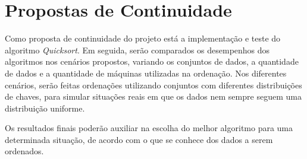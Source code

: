  
\section{Propostas de Continuidade}



Como proposta de continuidade do projeto está a implementação e teste do algoritmo \textit{Quicksort}. 
Em seguida, serão comparados os desempenhos dos algoritmos nos cenários propostos, variando os conjuntos de dados,  a quantidade
de dados e a quantidade de máquinas utilizadas na ordenação. Nos diferentes cenários, serão feitas ordenações utilizando conjuntos com diferentes distribuições de chaves,
para simular situações reais em que os dados nem sempre seguem uma distribuição uniforme.

Os resultados finais poderão auxiliar na escolha do melhor algoritmo para uma determinada situação, de acordo com o que se conhece dos dados a serem ordenados.  